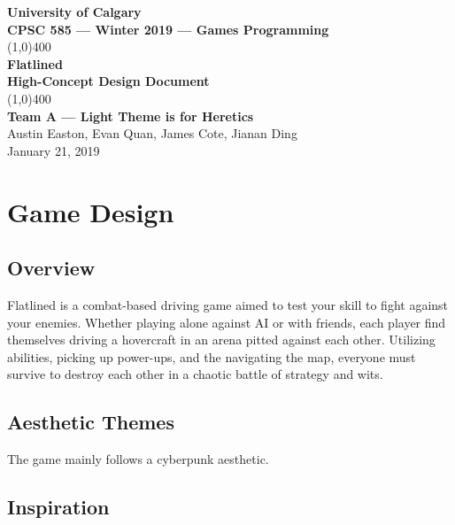 \documentclass{article}
\newcommand{\name}{Flatlined}
\newcommand{\team}{Team A --- Light Theme is for Heretics}
\theoremstyle{definition}
\begin{document}
\begin{titlepage}
  \begin{center}
    \vspace*{1cm}
    \Large{\textbf{University of Calgary}}\\
    \Large{\textbf{CPSC 585 --- Winter 2019 --- Games Programming}}\\
    \vfill
    \line(1,0){400}\\[1mm]
    \huge{\textbf{\name{}}}\\
    \large{\textbf{High-Concept Design Document}}\\
    \line(1,0){400}\\
    \vfill
    \Large{\textbf{\team{}}}\\
    \Large{Austin Easton, Evan Quan, James Cote, Jianan Ding}\\
    \large{January 21, 2019}
  \end{center}
\end{titlepage}
\setcounter{page}{0}
\tableofcontents
{}
\break{}

\section{Game Design}

\subsection{Overview}

\name{} is a combat-based driving game aimed to test your skill to fight
against your enemies. Whether playing alone against AI or with friends, each
player find themselves driving a hovercraft in an arena pitted against each
other. Utilizing abilities, picking up power-ups, and the navigating the map,
everyone must survive to destroy each other in a chaotic battle of strategy and
wits.

\subsection{Aesthetic Themes}

The game mainly follows a cyberpunk aesthetic.

\subsection{Inspiration}
\end{document}

